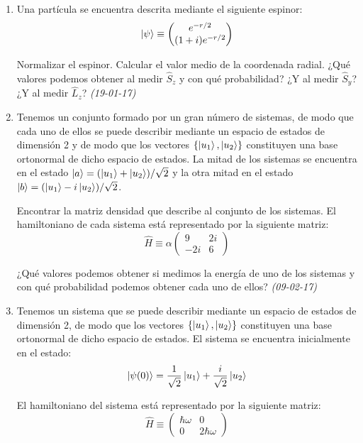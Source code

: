 \begin{enumerate}
    \item Una partícula se encuentra descrita mediante el siguiente espinor:
    \[
    \ket{\psi} \equiv 
    \begin{pmatrix}
    e^{-r/2} \\
    (1 + i) e^{-r/2}
    \end{pmatrix}
    \]
    
    Normalizar el espinor. Calcular el valor medio de la coordenada radial. ¿Qué valores podemos obtener al medir \( \hat{S}_z \) y con qué probabilidad? ¿Y al medir \( \hat{S}_y \)? ¿Y al medir \( \hat{L}_z \)? \textit{(19-01-17)}
    
    \item Tenemos un conjunto formado por un gran número de sistemas, de modo que cada uno de ellos se puede describir mediante un espacio de estados de dimensión 2 y de modo que los vectores $\{\ket{u_1}, \ket{u_2}\}$ constituyen una base ortonormal de dicho espacio de estados. La mitad de los sistemas se encuentra en el estado $\ket{a} = (\ket{u_1} + \ket{u_2}) / \sqrt{2}$ y la otra mitad en el estado $\ket{b} = (\ket{u_1} - i \ket{u_2}) / \sqrt{2}$. 

    Encontrar la matriz densidad que describe al conjunto de los sistemas. El hamiltoniano de cada sistema está representado por la siguiente matriz:
    \[
    \hat{H} \equiv \alpha \begin{pmatrix} 9 & 2i \\ -2i & 6 \end{pmatrix}
    \]
    
    ¿Qué valores podemos obtener si medimos la energía de uno de los sistemas y con qué probabilidad podemos obtener cada uno de ellos? \textit{(09-02-17)}
    
    
    \item Tenemos un sistema que se puede describir mediante un espacio de estados de dimensión 2, de modo que los vectores $\{\ket{u_1}, \ket{u_2}\}$ constituyen una base ortonormal de dicho espacio de estados. El sistema se encuentra inicialmente en el estado:
    \[
    \ket{\psi (0)} = \frac{1}{\sqrt{2}} \ket{u_1} + \frac{i}{\sqrt{2}} \ket{u_2}
    \]
    
    El hamiltoniano del sistema está representado por la siguiente matriz:
    \[
    \hat{H} \equiv \begin{pmatrix} \hbar \omega & 0 \\ 0 & 2 \hbar \omega \end{pmatrix}
    \]
    

\end{enumerate}
